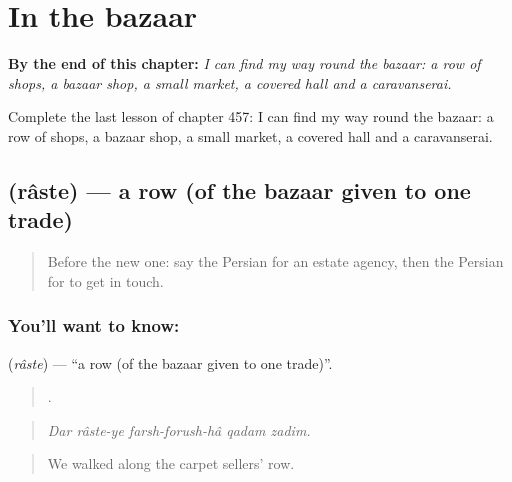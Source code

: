 
\chapter{In the bazaar}
\label{ch:fa-in-the-bazaar}

\begin{chapteropening}
\textbf{By the end of this chapter:} \emph{I can find my way round the bazaar: a row of shops, a bazaar shop, a small market, a covered hall and a caravanserai.}

Complete the last lesson of chapter 457: I can find my way round the bazaar: a row of shops, a bazaar shop, a small market, a covered hall and a caravanserai.
\end{chapteropening}

\section[\texorpdfstring{\fa{راسته} (râste)}{راسته (râste)}]{ (râste) — a row (of the bazaar given to one trade)}

\label{lesson:FA-C457-raste}



\begin{quote}
Before the new one: say the Persian for an estate agency, then the Persian for to get in touch.
\end{quote}

\subsection*{You'll want to know: }
\textbf{} (\emph{râste}) — \textquotedblleft{}a row (of the bazaar given to one trade)\textquotedblright{}.

\begin{quote}
     .
\end{quote}

\begin{quote}
\emph{Dar râste-ye farsh-forush-hâ qadam zadim.}
\end{quote}

\begin{quote}
We walked along the carpet sellers' row.
\end{quote}


